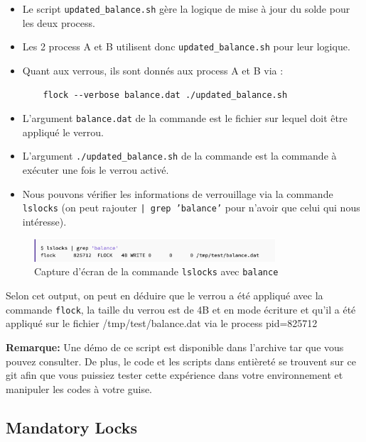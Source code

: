 \begin{itemize}
    \item Le script \texttt{updated\_balance.sh} gère la logique de mise à jour du solde pour les deux process.
    \item Les 2 process A et B utilisent donc \texttt{updated\_balance.sh} pour leur logique.
    \item Quant aux verrous, ils sont donnés aux process A et B via :
    \begin{lstlisting}
    flock --verbose balance.dat ./updated_balance.sh
    \end{lstlisting}
    \item L'argument \texttt{balance.dat} de la commande est le fichier sur lequel doit être appliqué le verrou.
    \item L'argument \texttt{./updated\_balance.sh} de la commande est la commande à exécuter une fois le verrou activé.
    \item Nous pouvons vérifier les informations de verrouillage via la commande \texttt{lslocks} (on peut rajouter \texttt{| grep 'balance'} pour n'avoir que celui qui nous intéresse).
\end{itemize}
\begin{figure}[h]
    \centering
    \includegraphics[width=0.8\textwidth]{img/lslocks-balance.png}
    \caption{Capture d'écran de la commande \texttt{lslocks} avec \texttt{balance}}
    \label{fig:lslocks-balance}
\end{figure}
Selon cet output, on peut en déduire que le verrou a été appliqué avec la commande \texttt{flock}, la taille du verrou est de 4B et en mode écriture et qu'il a été appliqué sur le fichier /tmp/test/balance.dat via le process pid=825712
\newline

\textbf{Remarque:} Une démo de ce script est disponible dans l'archive tar que vous pouvez consulter. De plus, le code et les scripts dans entièreté se trouvent sur ce git\cite{git} afin que vous puissiez tester cette expérience dans votre environnement et manipuler les codes à votre guise.
\newline

\subsection{Mandatory Locks}

